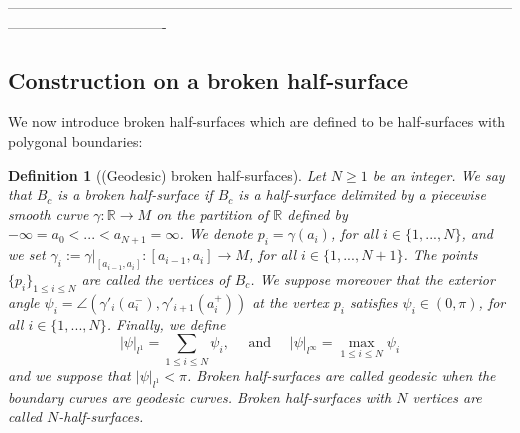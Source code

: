 \documentclass{article}
\newcommand{\R}{\mathbb{R}}
\newcommand{\surf}{M}
\newcommand{\halfP}{B}
\newcommand{\psim}{|\psi|_{l^\infty}}
\newcommand{\psitot}{|\psi|_{l^1}}
\newtheorem{definitionE}[theorem]{Definition}
\theoremstyle{remark}
\theoremstyle{prpart}
\begin{document}
----------------------------------------------------------------------------------------------------------------------------------------------































\subsection{Construction on a broken half-surface}\label{subsubsec:half-surfaces-to-sector}
We now introduce broken half-surfaces which are defined to be half-surfaces with polygonal boundaries:
\begin{definitionE}[(Geodesic) broken half-surfaces]\label{def:n-half-surfaces}
  Let $N\geq 1$ be an integer. We say that $\halfP_c$ is a \emph{broken half-surface} if $\halfP_c$ is a half-surface delimited by a piecewise smooth curve $\gamma:\R\to\surf$ on the partition of $\R$ defined by $-\infty=a_0<...<a_{N+1}=\infty$. We denote $p_i=\gamma(a_i)$, for all $i\in\{1,...,N\}$, and we set $\gamma_i:=\gamma\big|_{[a_{i-1},a_i]}:[a_{i-1},a_i]\to\surf$, for all $i\in\{1,...,N+1\}$. The points $\{p_i\}_{1\leq i\leq N}$ are called the vertices of $\halfP_c$. We suppose moreover that the exterior angle $\psi_i = \angle(\gamma'_{i}(a_i^-), \gamma'_{i+1}(a_i^+))$ at the vertex $p_i$ satisfies $\psi_i\in(0,\pi)$, for all $i\in\{1,...,N\}$. Finally, we define
\begin{equation*}
\psitot=\sum_{1\leq i\leq N}\psi_i,\quad\text{ and }\quad \psim = \max_{1\leq i\leq N}\psi_i
\end{equation*}
and we suppose that $\psitot<\pi$. \emph{Broken half-surfaces} are called geodesic when the boundary curves are geodesic curves. Broken half-surfaces with $N$ vertices are called \emph{$N$-half-surfaces}.
\end{definitionE}
\end{document}
